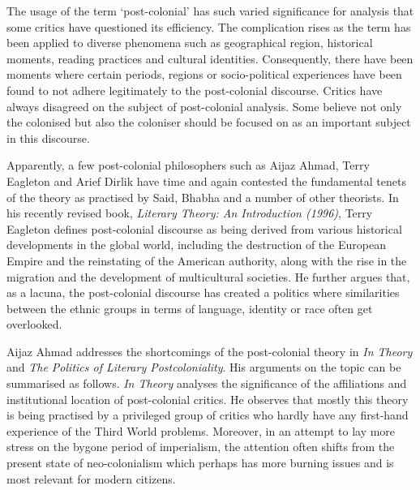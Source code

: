 The usage of the term `post-colonial' has such varied significance for analysis that some critics have questioned its efficiency. The complication rises as the term has been applied to diverse phenomena such as geographical region, historical moments, reading practices and cultural identities. Consequently, there have been moments where certain periods, regions or socio-political experiences have been found to not adhere legitimately to the post-colonial discourse. Critics have always disagreed on the subject of post-colonial analysis. Some believe not only the colonised but also the coloniser should be focused on as an important subject in this discourse. 

Apparently, a few post-colonial philosophers such as Aijaz Ahmad, Terry Eagleton and Arief Dirlik have time and again contested the fundamental tenets of the theory as practised by Said, Bhabha and a number of other theorists. In his recently revised book, \emph{Literary Theory: An Introduction (1996)}, Terry Eagleton defines post-colonial discourse as being derived from various historical developments in the global world, including the destruction of the European Empire and the reinstating of the American authority, along with the rise in the migration and the development of multicultural societies. He further argues that, as a lacuna, the post-colonial discourse has created a politics where similarities between the ethnic groups in terms of language, identity or race often get overlooked.

Aijaz Ahmad addresses the shortcomings of the post-colonial theory in \emph{In Theory} and \emph{The Politics of Literary Postcoloniality}. His arguments on the topic can be summarised as follows. \emph{In Theory} analyses the significance of the affiliations and institutional location of post-colonial critics. He observes that mostly this theory is being practised by a privileged group of critics who hardly have any first-hand experience of the Third World problems. Moreover, in an attempt to lay more stress on the bygone period of imperialism, the attention often shifts from the present state of neo-colonialism which perhaps has more burning issues and is most relevant for modern citizens.

